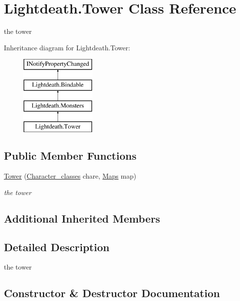 \hypertarget{class_lightdeath_1_1_tower}{}\section{Lightdeath.\+Tower Class Reference}
\label{class_lightdeath_1_1_tower}


the tower  


Inheritance diagram for Lightdeath.\+Tower\+:\begin{figure}[H]
\begin{center}
\leavevmode
\includegraphics[height=4.000000cm]{class_lightdeath_1_1_tower}
\end{center}
\end{figure}
\subsection*{Public Member Functions}
\begin{DoxyCompactItemize}
\item 
\hyperlink{class_lightdeath_1_1_tower_a320e7cbe11925ea43e634553c0ade415}{Tower} (\hyperlink{class_lightdeath_1_1_character__classes}{Character\+\_\+classes} chare, \hyperlink{class_lightdeath_1_1_maps}{Maps} map)
\begin{DoxyCompactList}\small\item\em the tower \end{DoxyCompactList}\end{DoxyCompactItemize}
\subsection*{Additional Inherited Members}


\subsection{Detailed Description}
the tower 



\subsection{Constructor \& Destructor Documentation}
\hypertarget{class_lightdeath_1_1_tower_a320e7cbe11925ea43e634553c0ade415}{}\label{class_lightdeath_1_1_tower_a320e7cbe11925ea43e634553c0ade415} 
